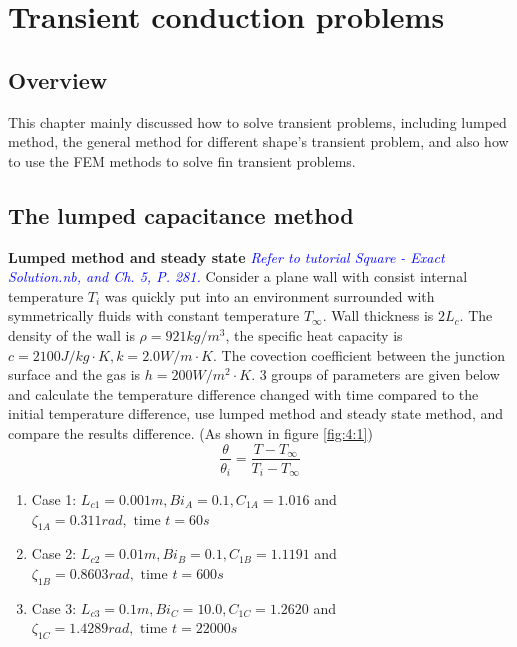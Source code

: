 \chapter{Transient conduction problems}
\section{Overview}
This chapter mainly discussed how to solve transient problems, including lumped method, the general method for different shape’s transient problem, and also how to use the FEM methods to solve fin transient problems.
\section{The lumped capacitance method}

\begin{example}
\textbf{Lumped method and steady state}
\textcolor{blue} {\emph{Refer to tutorial Square - Exact Solution.nb, and Ch. 5, P. 281.}}
Consider a plane wall with consist internal temperature $T_i$ was quickly put into an 
environment surrounded with symmetrically fluids with constant temperature $T_\infty$. 
Wall thickness is $2L_c$. The density of the wall is $\rho=921kg/m^3 $,
the specific heat capacity is $c=2100J/kg\cdot K, k=2.0W/m\cdot K$. The covection coefficient between the junction surface and the
gas is $h=200W/m^2\cdot K$. 3 groups of parameters are given below and 
calculate the temperature difference changed with time compared to the initial temperature difference, use lumped method and steady state method, and compare the results difference. (As shown in figure \ref{fig:4:1})
$$\frac{\theta}{\theta_i}=\frac{T-T_\infty}{T_i-T_\infty}$$
\begin{enumerate}
\item Case 1: $L_{c1}=0.001 m, Bi_A=0.1, C_{1A}=1.016$ and \\
$\zeta_{1A}=0.311 rad, \text{ time } t=60s$
\item Case 2: $L_{c2}=0.01 m, Bi_B=0.1, C_{1B}=1.1191$ and \\
$\zeta_{1B}=0.8603 rad, \text{ time } t=600s$
\item Case 3: $L_{c3}=0.1 m, Bi_C=10.0, C_{1C}=1.2620$ and \\
$\zeta_{1C}=1.4289 rad, \text{ time } t=22000s$
\end{enumerate}
\end{example}
